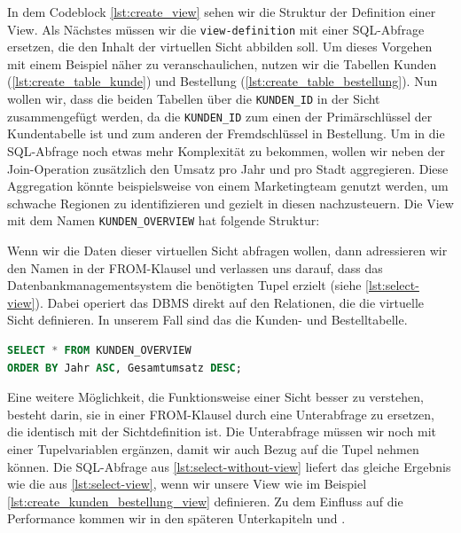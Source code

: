 In dem Codeblock \ref{lst:create_view} sehen wir die Struktur der Definition einer View.
Als Nächstes müssen wir die \texttt{view-definition} mit einer SQL-Abfrage ersetzen, die den Inhalt der virtuellen Sicht abbilden soll.
Um dieses Vorgehen mit einem Beispiel näher zu veranschaulichen, nutzen wir die Tabellen Kunden (\ref{lst:create_table_kunde}) und Bestellung (\ref{lst:create_table_bestellung}).
Nun wollen wir, dass die beiden Tabellen über die \texttt{KUNDEN\_ID} in der Sicht zusammengefügt werden, da die \texttt{KUNDEN\_ID} zum einen der Primärschlüssel der Kundentabelle ist und zum anderen der Fremdschlüssel in Bestellung.
Um in die SQL-Abfrage noch etwas mehr Komplexität zu bekommen, wollen wir neben der Join-Operation zusätzlich den Umsatz pro Jahr und pro Stadt aggregieren.
Diese Aggregation könnte beispielsweise von einem Marketingteam genutzt werden, um schwache Regionen zu identifizieren und gezielt in diesen nachzusteuern.
Die View mit dem Namen \texttt{KUNDEN\_OVERVIEW} hat folgende Struktur:

\vspace{-5pt}


Wenn wir die Daten dieser virtuellen Sicht abfragen wollen, dann adressieren wir den Namen in der FROM-Klausel und verlassen uns darauf, dass das Datenbankmanagementsystem die benötigten Tupel erzielt (siehe \ref{lst:select-view}).
Dabei operiert das DBMS direkt auf den Relationen, die die virtuelle Sicht definieren.
In unserem Fall sind das die Kunden- und Bestelltabelle.

\vspace{-5pt}
\begin{lstlisting}[language=SQL,caption=SQL-Befehl mit Sicht,label={lst:select-view}]
SELECT * FROM KUNDEN_OVERVIEW
ORDER BY Jahr ASC, Gesamtumsatz DESC;
\end{lstlisting}
\vspace{-5pt}

Eine weitere Möglichkeit, die Funktionsweise einer Sicht besser zu verstehen, besteht darin, sie in einer FROM-Klausel durch eine Unterabfrage zu ersetzen, die identisch mit der Sichtdefinition ist.
Die Unterabfrage müssen wir noch mit einer Tupelvariablen ergänzen, damit wir auch Bezug auf die Tupel nehmen können.
Die SQL-Abfrage aus \ref{lst:select-without-view} liefert das gleiche Ergebnis wie die aus \ref{lst:select-view}, wenn wir unsere View wie im Beispiel \ref{lst:create_kunden_bestellung_view} definieren.
Zu dem Einfluss auf die Performance kommen wir in den späteren Unterkapiteln  und .

